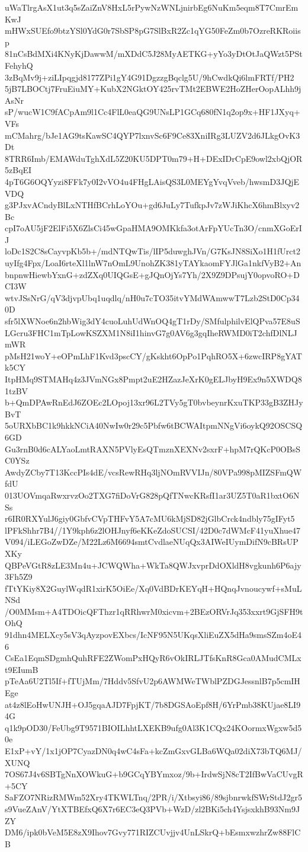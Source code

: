 uWaTlrgAsX1ut3q5sZaiZnV8HxL5rPywNzWNLjnirbEg6NuKm5eqm8T7CmrEmKwJ
mHWxSUEfo9btzYSl0YdG0r7SbSP8pG7SlBxR2Zc1qYG50FeZm0b7OzreRKRoiisp
81nCsBdMXi4KNyKjDawwM/mXDdC5J28MyAETKG+yYo3yDtOtJaQWzt5PStFehyhQ
3zBqMv9j+ziLIpqgjd8177ZPi1gY4G91DgzzgBqclg5U/9hCwdkQi6lmFRTf/PH2
5jB7LBOCtj7FruEiuMY+KubX2NGktOY425rvTMt2EBWE2HoZHerOopALhh9jAsNr
sP/wucW1C9fACpAm9l1Cc4FlL0eaQG9UNsLP1GCq680fN1q2op9x+HF1JXyq+VFs
mCMahrg/bJe1AG9tsKawSC4QYP7lxnvSc6F9Ce83XniIRg3LUZV2d6JLkgOvK3Dt
8TRR6Imb/EMAWduTghXdL5Z20KU5DPT0m79+H+DExIDrCpE9owl2xbQjOR5zBqEI
4pT6G6OQYyzi8FFk7y0I2vVO4u4FHgLAisQS3L0MEYgYvqVveb/hwsmD3JQjEVDQ
g3PJxvACndyBlLxNTHfBCrhLoYOu+gd6JuLy7TufkpJv7zWJiKhcX6hmBlxyv2Bc
cpI7oAU5jF2ElFi5X6ZlsCi45wGpaHMA9OMKkfa3otArFpYUcTn3O/cnmXGoErIJ
loDc1S2C8sCayvpKb5b+/mdNTQwTis/lIP5duwghJVn/G7KsJN8SiXo1H1fUrct2
uyIfg4Fpx/LoaI6rteXl1lnW7nOmL9UnohZK381yTAYkaomFYJlGa1nkfVyB2+An
bnpnwHiewbYxnG+zdZXq0UIQGsE+gJQnOjYs7Yh/2X9Z9DPsujY0opvoRO+DCI3W
wtvJSsNrG/qV3djvpUbq1uqdlq/nH0u7cTO35itvYMdWAmwwT7Lzb2StD0Cp340D
sfr5lXWNoe6n2hbWig3dY4cuoLuhUdWnOQ4gT1rDy/SMfulphilvElQPva57E8uS
LGcru3FHC1mTpLowKSZXM1N8iI1hinvG7g0AV6g3gqIheRWMD0iT2chfDlNLJmWR
pMsH21woY+eOPmLhF1Kvd3pscCY/gKskht6OpPo1PqhRO5X+6zwcIRP8gYATk5CY
ItpHMq9STMAHq4z3JVmNGx8Pmpt2uE2HZazJeXrK0gELJbyH9Ex9n5XWDQ81tzBV
b+QmDPAwRnEdJ6ZOEc2LOpoj13xr96L2TVy5gT0bvbeynrKxuTKP33gB3ZHJyBvT
5oURXbBC1k9hkkNCiA40NwIw0r29c5Pbfw6tBCWAItpmNNgVi6oykQ92OSCSQ6GD
Gu3rnB0d6cALYaoLmtRAXN5PVlyEsQTmznXEXNv2sxrF+hpM7rQKcP0OBsSC0YSz
AwdyZCby7T13KccPIs4dE/vcsRewRHq3ljNOmRVVIJn/80VPa998pMIZSFmQWfdU
013UOVmqaRwxrvzOo2TXG7fiDoVrG828pQfTNwcKRsfI1ar3UZ5T0aR1bxtO6NSs
r6IR0RXYulJ6giy0GbfvCVpTHFvY5A7cMU6kMjSD82jGlbCrck4ndbly75gIFyt5
lPFkShhr7B4//1Y9kph6z2lOHJnyf6eKKeZdoSUCSI/42D0c7dWMcF41yuXhue47
V094/iLEGoZwDZe/M22Lz6M6694smtCvdlaeNUqQx3AIWeIUymDifN9cBRsUPXKy
QBPeVGtR8zLE3Mn4u+JCWQWha+WkTa8QWJxvprDdOXldH8vgkunh6P6ajy3Fh5Z9
fTtYKiy8X2GuylWqdR1xirK5OiEe/Xq0VdBDrKEYqH+HQnqJvnoucywf+sMuLNSd
/O0MMsm+A4TDOicQFThzr1qRRhwrM0xicvm+2BEzORVrJq353xxrt9GjSFH9tOhQ
91dhn4MELXcy5sV3qAyzpovEXbcs/IcNF95N5UKqsXliEuZX5dHa9smsSZm4oE46
CsEa1EqmSDgmhQuhRFE2ZWomPxHQyR6vOkIRLJTfsKnR8Gca0AMudCMLxt9EIumB
pTeAa6U2Tl5If+fTUjMm/7Hddv5SfvU2p6AWMWeTWblPZDGJessnlB7p5cmIHEge
at4z8lEoHwUNJH+OJ5gqaAJD7FpjKT/7b8DGSAoEpf8H/6YrPmb38KUjae8LI94G
q1k9pOD30/FeUbg9T9571BIOILhhtLXEKB9ufg0Al3K1CQx24KOormxWgxw5d50e
E1xP+vY/1x1jOP7CyazDN0q4wC4sFa+kcZmGxvGLBa6WQa02diX73bTQ6MJ/XUNQ
7OS67J4v6SBTgNnXOWkuG+b9GCqYBYmxoz/9b+IrdwSjN8cT2IfBwVaCUvgR+5CY
SaFZO7NRizRMWm52Xry4TKWLTnq/2PR/i/Xtbsyi86/89sjbnrwkfSWrStdJ2gr5
s9VueZAnV/YtXTBEfxQ6X7r6EC3eQ3PVb+WzD/zl2BKi5ch4YsjsxkhB93Nm9JZY
DM6/ipk0bVeM5E8zX9Ihov7Gvy771RIZCUvjjv4UnLSkrQ+bEsmxwzhrZw88FlCB
